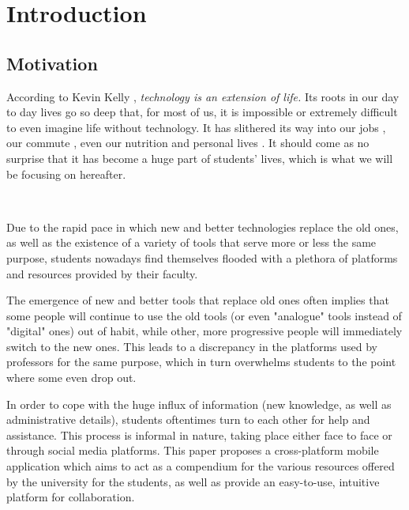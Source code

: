 \chapter{Introduction} \label{chapter1}

\section{Motivation} \label{1:motivation}

    According to Kevin Kelly \cite{kelly2010technology}, \textit{technology is an extension of life.} Its roots in our day to day lives go so deep that, for most of us, it is impossible or extremely difficult to even imagine life without technology. It has slithered its way into our jobs \cite{lewis1996studying}, our commute \cite{kairi2019technology}, even our nutrition \cite{lewis2010role} and personal lives \cite{mcquillen2003influence}. It should come as no surprise that it has become a huge part of students' lives, which is what we will be focusing on hereafter.
    
    ~
    
    Due to the rapid pace in which new and better technologies replace the old ones, as well as the existence of a variety of tools that serve more or less the same purpose, students nowadays find themselves flooded with a plethora of platforms and resources provided by their faculty.
    
    The emergence of new and better tools that replace old ones often implies that some people will continue to use the old tools (or even "analogue" tools instead of "digital" ones) out of habit, while other, more progressive people will immediately switch to the new ones. This leads to a discrepancy in the platforms used by professors for the same purpose, which in turn overwhelms students to the point where some even drop out.
    
    In order to cope with the huge influx of information (new knowledge, as well as administrative details), students oftentimes turn to each other for help and assistance. This process is informal in nature, taking place either face to face or through social media platforms.
    \clearpage
    This paper proposes a cross-platform mobile application which aims to act as a compendium for the various resources offered by the university for the students, as well as provide an easy-to-use, intuitive platform for collaboration.

